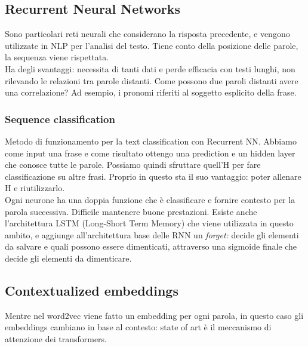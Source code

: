\newpage

\subsection{Recurrent Neural Networks}
Sono particolari reti neurali che considerano la risposta precedente, e vengono utilizzate in NLP per l'analisi del testo. Tiene conto della posizione delle parole, la sequenza viene rispettata. 
\\
Ha degli svantaggi: necessita di tanti dati e perde efficacia con testi lunghi, non rilevando le relazioni tra parole distanti. Come possono due paroli distanti avere una correlazione? Ad esempio, i pronomi riferiti al soggetto esplicito della frase. 

\subsubsection{Sequence classification}
Metodo di funzionamento per la text classification con Recurrent NN. Abbiamo come input una frase e come risultato ottengo una prediction e un hidden layer che conosce tutte le parole. Possiamo quindi sfruttare quell'H per fare classificazione su altre frasi. Proprio in questo sta il suo vantaggio: poter allenare H e riutilizzarlo.
\\
Ogni neurone ha una doppia funzione che è classificare e fornire contesto per la parola successiva. Difficile mantenere buone prestazioni. Esiste anche l'architettura LSTM (Long-Short Term Memory) che viene utilizzata in questo ambito, e aggiunge all'architettura base delle RNN un \textit{forget:} decide gli elementi da salvare e quali possono essere dimenticati, attraverso una sigmoide finale che decide gli elementi da dimenticare. 

\subsection{Contextualized embeddings}
Mentre nel word2vec viene fatto un embedding per ogni parola, in questo caso gli embeddings cambiano in base al contesto: state of art è il meccanismo di attenzione dei transformers. 

